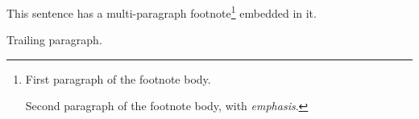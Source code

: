 This sentence has a multi-paragraph footnote\footnote{First paragraph of the footnote body.

	Second paragraph of the footnote body, with \emph{emphasis}.} embedded in it.

Trailing paragraph.

